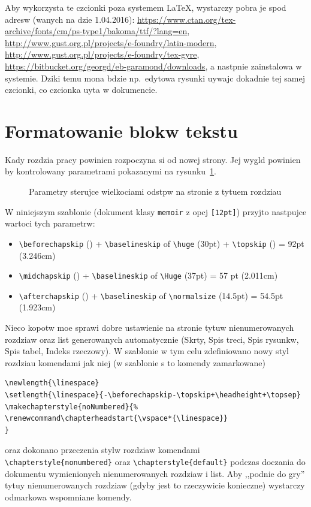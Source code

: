Aby wykorzysta te czcionki poza systemem LaTeX, wystarczy pobra je spod adresw (wanych na dzie
1.04.2016): 
\url{https://www.ctan.org/tex-archive/fonts/cm/ps-type1/bakoma/ttf/?lang=en}, \url{http://www.gust.org.pl/projects/e-foundry/latin-modern}, \url{http://www.gust.org.pl/projects/e-foundry/tex-gyre}, \url{https://bitbucket.org/georgd/eb-garamond/downloads},
a nastpnie zainstalowa w systemie. Dziki temu mona bdzie np.~edytowa rysunki uywajc dokadnie tej samej czcionki, co czcionka uyta w dokumencie.

\section{Formatowanie blokw tekstu}
Kady rozdzia pracy powinien rozpoczyna si od nowej strony. Jej wygld powinien by kontrolowany parametrami pokazanymi na rysunku~\ref{fig:LayChap}.
\begin{figure}[t]
\centering
\chapterdiagram
\caption{Parametry sterujce wielkociami odstpw na stronie z tytuem rozdziau} 
\label{fig:LayChap}
\end{figure}
W niniejszym szablonie (dokument klasy \texttt{memoir} z opcj \texttt{[12pt]}) przyjto nastpujce wartoci tych parametrw:
\begin{itemize}
\item \verb?\beforechapskip? (\printlength{\beforechapskip}) + \verb?\baselineskip? of \verb+\huge+ (30pt) + \verb+\topskip+ (\printlength{\topskip}) = 92pt (3.246cm)
\item \verb?\midchapskip? (\printlength{\midchapskip}) + \verb?\baselineskip? of \verb+\Huge+ (37pt) = 57 pt (2.011cm)
\item \verb?\afterchapskip? (\printlength{\afterchapskip}) + \verb+\baselineskip+ of \verb+\normalsize+ (14.5pt) = 54.5pt (1.923cm)
\end{itemize}

Nieco kopotw moe sprawi dobre ustawienie na stronie tytuw nienumerowanych rozdziaw oraz list generowanych automatycznie (Skrty, Spis treci, Spis rysunkw, Spis tabel, Indeks rzeczowy). W szablonie w tym celu zdefiniowano nowy styl rozdziau komendami jak niej (w szablonie s to komendy zamarkowane)
\begin{lstlisting}[basicstyle=\footnotesize\ttfamily]
\newlength{\linespace}
\setlength{\linespace}{-\beforechapskip-\topskip+\headheight+\topsep}
\makechapterstyle{noNumbered}{%
\renewcommand\chapterheadstart{\vspace*{\linespace}}
}
\end{lstlisting}
oraz dokonano przeczenia stylw rozdziaw komendami \verb?\chapterstyle{nonumbered}? oraz \verb?\chapterstyle{default}? podczas doczania do dokumentu wymienionych nienumerowanych rozdziaw i list. Aby ,,podnie do gry'' tytuy nienumerowanych rozdziaw (gdyby jest to rzeczywicie konieczne) wystarczy odmarkowa wspomniane komendy.

